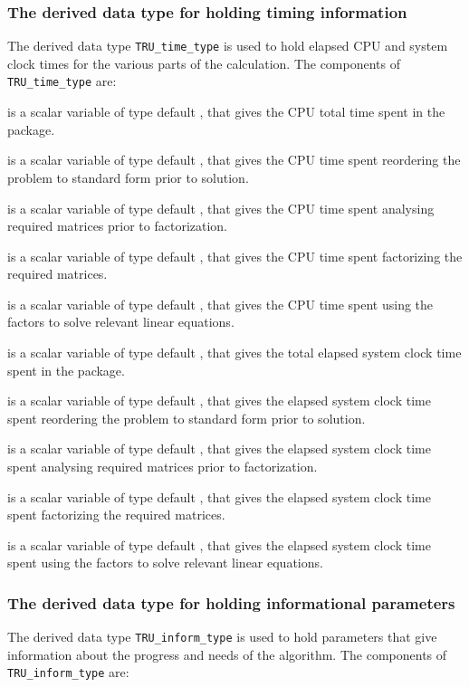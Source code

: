 \documentclass{galahad}
\newcommand{\packagename}{TRU}
\begin{document}
\subsubsection{The derived data type for holding timing
 information}\label{typetime}
The derived data type
{\tt \packagename\_time\_type}
is used to hold elapsed CPU and system clock times for the various parts
of the calculation. The components of
{\tt \packagename\_time\_type}
are:
\begin{description}
 is a scalar variable of type default \real, that gives
 the CPU total time spent in the package.

 is a scalar variable of type default \realdp, that gives
 the CPU time spent reordering the problem to standard form prior to solution.

 is a scalar variable of type default \realdp, that gives
 the CPU time spent analysing required matrices prior to factorization.

 is a scalar variable of type default \realdp, that gives
 the CPU time spent factorizing the required matrices.

 is a scalar variable of type default \realdp, that gives
 the CPU time spent using the factors to solve relevant linear equations.

 is a scalar variable of type default \real, that gives
 the total elapsed system clock time spent in the package.

 is a scalar variable of type default \realdp, that gives
 the elapsed system clock time spent reordering the problem to standard form
prior to solution.

 is a scalar variable of type default \realdp, that gives
 the  elapsed system clock time spent analysing required matrices prior to
factorization.

 is a scalar variable of type default \realdp, that gives
 the  elapsed system clock time spent factorizing the required matrices.

 is a scalar variable of type default \realdp, that gives
 the  elapsed system clock time spent using the factors to solve relevant
linear equations.

\end{description}


\subsubsection{The derived data type for holding informational
 parameters}\label{typeinform}
The derived data type
{\tt \packagename\_inform\_type}
is used to hold parameters that give information about the progress and needs
of the algorithm. The components of
{\tt \packagename\_inform\_type}
are:
\end{document}
